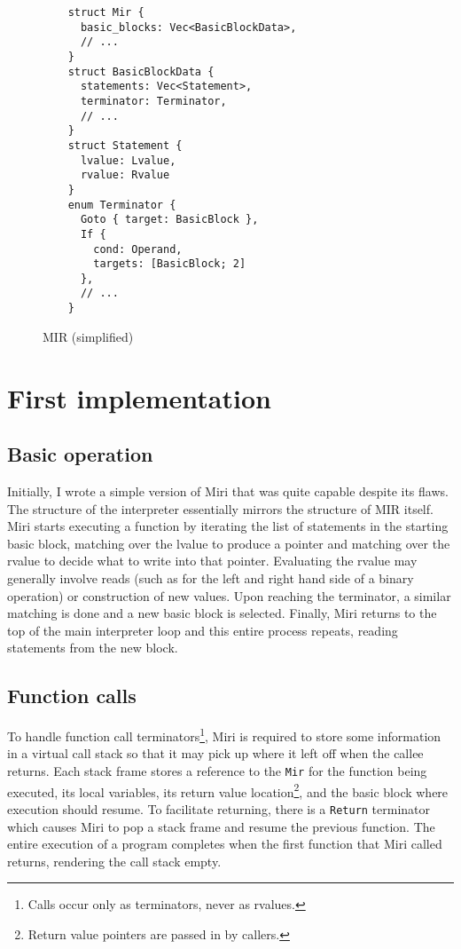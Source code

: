 \documentclass[twocolumn]{article}
\newcommand{\rust}[1]{\texttt{#1}}
\begin{document}
\begin{figure}[ht]
  \begin{verbatim}
    struct Mir {
      basic_blocks: Vec<BasicBlockData>,
      // ...
    }
    struct BasicBlockData {
      statements: Vec<Statement>,
      terminator: Terminator,
      // ...
    }
    struct Statement {
      lvalue: Lvalue,
      rvalue: Rvalue
    }
    enum Terminator {
      Goto { target: BasicBlock },
      If {
        cond: Operand,
        targets: [BasicBlock; 2]
      },
      // ...
    }
  \end{verbatim}
  \caption{MIR (simplified)}
  \label{fig:mir}
\end{figure}

\section{First implementation}

\subsection{Basic operation}

Initially, I wrote a simple version of Miri that was quite capable despite its flaws. The structure
of the interpreter essentially mirrors the structure of MIR itself. Miri starts executing a function
by iterating the list of statements in the starting basic block, matching over the lvalue to produce
a pointer and matching over the rvalue to decide what to write into that pointer. Evaluating the
rvalue may generally involve reads (such as for the left and right hand side of a binary operation)
or construction of new values. Upon reaching the terminator, a similar matching is done and a new
basic block is selected. Finally, Miri returns to the top of the main interpreter loop and this
entire process repeats, reading statements from the new block.

\subsection{Function calls}

To handle function call terminators\footnote{Calls occur only as terminators, never as rvalues.},
Miri is required to store some information in a virtual call stack so that it may pick up where it
left off when the callee returns. Each stack frame stores a reference to the \rust{Mir} for the
function being executed, its local variables, its return value location\footnote{Return value
pointers are passed in by callers.}, and the basic block where execution should resume. To
facilitate returning, there is a \rust{Return} terminator which causes Miri to pop a stack frame and
resume the previous function. The entire execution of a program completes when the first function
that Miri called returns, rendering the call stack empty.
\end{document}
